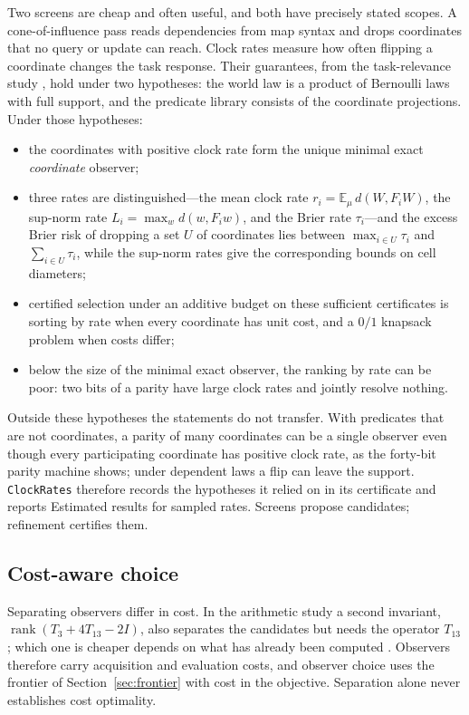 \documentclass[11pt]{article}
\newcommand{\code}[1]{\texttt{#1}}
\newcommand{\rank}{\operatorname{rank}}
\theoremstyle{definition}
\theoremstyle{plain}
\begin{document}
Two screens are cheap and often useful, and both have precisely stated scopes. A cone-of-influence
pass reads dependencies from map syntax and drops coordinates that no query or update can reach.
Clock rates measure how often flipping a coordinate changes the task response. Their guarantees,
from the task-relevance study \cite{paperone}, hold under two hypotheses: the world law is a product
of Bernoulli laws with full support, and the predicate library consists of the coordinate
projections. Under those hypotheses:
\begin{itemize}
\item the coordinates with positive clock rate form the unique minimal exact \emph{coordinate}
observer;
\item three rates are distinguished---the mean clock rate $r_i=\mathbb E_\mu\,d(W,F_iW)$, the
sup-norm rate $L_i=\max_w d(w,F_iw)$, and the Brier rate $\tau_i$---and the excess Brier risk of
dropping a set $U$ of coordinates lies between $\max_{i\in U}\tau_i$ and $\sum_{i\in U}\tau_i$,
while the sup-norm rates give the corresponding bounds on cell diameters;
\item certified selection under an additive budget on these sufficient certificates is sorting by
rate when every coordinate has unit cost, and a $0/1$ knapsack problem when costs differ;
\item below the size of the minimal exact observer, the ranking by rate can be poor: two bits of a
parity have large clock rates and jointly resolve nothing.
\end{itemize}
Outside these hypotheses the statements do not transfer. With predicates that are not coordinates,
a parity of many coordinates can be a single observer even though every participating coordinate
has positive clock rate, as the forty-bit parity machine shows; under dependent laws a flip can
leave the support. \code{ClockRates} therefore records the hypotheses it relied on in its
certificate and reports Estimated results for sampled rates. Screens propose candidates; refinement
certifies them.

\subsection{Cost-aware choice}

Separating observers differ in cost. In the arithmetic study a second invariant,
$\rank(T_3+4T_{13}-2I)$, also separates the candidates but needs the operator $T_{13}$; which one is
cheaper depends on what has already been computed \cite{langlands}. Observers therefore carry
acquisition and evaluation costs, and observer choice uses the frontier of
Section~\ref{sec:frontier} with cost in the objective. Separation alone never establishes cost
optimality.
\end{document}
